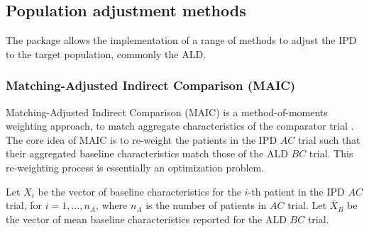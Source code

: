 \documentclass[article]{jss}
\begin{document}


\subsection{Population adjustment methods}
\label{sec:paic-methods}
The  package allows the implementation of a range of methods to adjust the IPD to the target population, commonly the ALD.


\subsubsection{Matching-Adjusted Indirect Comparison (MAIC)}
Matching-Adjusted Indirect Comparison (MAIC) is a method-of-moments weighting approach, to match aggregate characteristics of the comparator trial \citep{signorovitch2010}. The core idea of MAIC is to re-weight the patients in the IPD $AC$ trial such that their aggregated baseline characteristics match those of the ALD $BC$ trial. This re-weighting process is essentially an optimization problem.

Let $X_i$ be the vector of baseline characteristics for the $i$-th patient in the IPD $AC$ trial, for $i = 1, \dots, n_A$, where $n_A$ is the number of patients in $AC$ trial. Let $\bar{X}_B$ be the vector of mean baseline characteristics reported for the ALD $BC$ trial.
\end{document}
